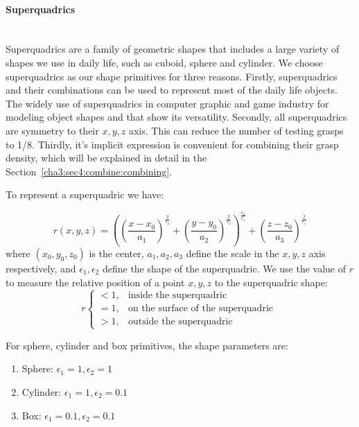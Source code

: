 \paragraph{Superquadrics} ~\\
Superquadrics are a family of geometric shapes that includes a large variety of shapes we use in daily life, such as cuboid, sphere and cylinder. We choose superquadrics as our shape primitives for three reasons. Firstly, superquadrics and their combinations can be used to represent most of the daily life objects. The widely use of superquadrics in computer graphic and game industry for modeling object shapes and that show its versatility. Secondly, all superquadrics are symmetry to their $x, y, z$ axis. This can reduce the number of testing grasps to 1/8. Thirdly, it's implicit expression is convenient for combining their grasp density, which will be explained in detail in the Section~\ref{cha3:sec4:combine:combining}.

To represent a superquadric we have:

\begin{equation}
r\left(x, y ,z\right) =
\left(\left(\frac{x-x_0}{a_1}\right)^{\frac{2}{\epsilon_2}} +
    \left(\frac{y-y_0}{a_2}\right)^{\frac{2}{\epsilon_2}}\right)^
    {\frac{\epsilon_2}{\epsilon_1}} +
    \left(\frac{z-z_0}{a_3}\right)^\frac{2}{\epsilon_1}
\end{equation}
where $\left(x_0, y_0, z_0\right)$ is the center, $a_1, a_2, a_3$ define the scale in the $x, y, z$ axis respectively, and $\epsilon_1, \epsilon_2$ define the shape of the superquadric.
We use the value of $r$ to measure the relative position of a point $x, y, z$ to the superquadric shape:
\begin{equation}
    r
    \begin{cases}
      <1, & \text{inside the superquadric}\  \\
      =1, & \text{on the surface of the superquadric}\ \\
      >1, & \text{outside the superquadric}
    \end{cases}
\end{equation}

For sphere, cylinder and box primitives, the shape parameters are:

\begin{enumerate}
\item Sphere: $\epsilon_1 = 1, \epsilon_2 = 1$
\item Cylinder: $\epsilon_1 = 1, \epsilon_2 = 0.1$
\item Box: $\epsilon_1 = 0.1, \epsilon_2 = 0.1$
\end{enumerate}

